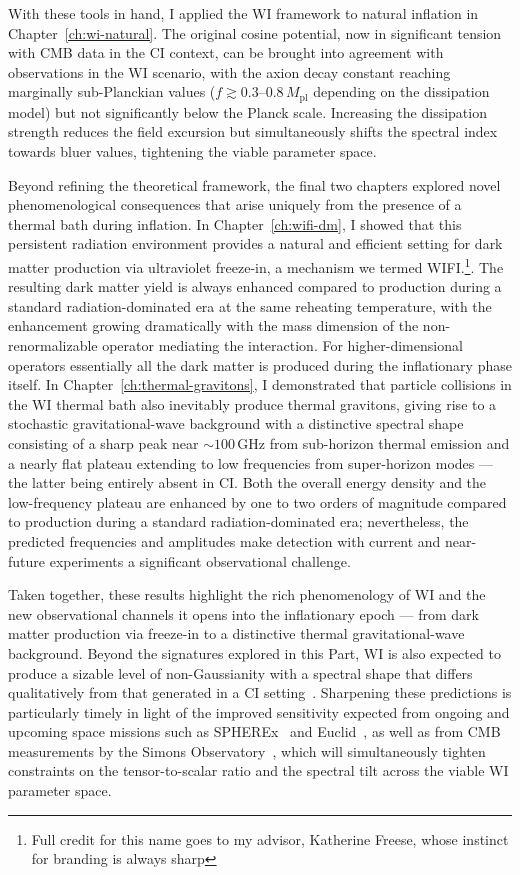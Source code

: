 With these tools in hand, I applied the WI framework to natural inflation in Chapter~\ref{ch:wi-natural}. The original cosine potential, now in significant tension with CMB data in the CI context, can be brought into agreement with observations in the WI scenario, with the axion decay constant reaching marginally sub-Planckian values ($f \gtrsim 0.3\text{--}0.8\,M_\mathrm{pl}$ depending on the dissipation model) but not significantly below the Planck scale. Increasing the dissipation strength reduces the field excursion but simultaneously shifts the spectral index towards bluer values, tightening the viable parameter space.


Beyond refining the theoretical framework, the final two chapters explored novel phenomenological consequences that arise uniquely from the presence of a thermal bath during inflation. In Chapter~\ref{ch:wifi-dm}, I showed that this persistent radiation environment provides a natural and efficient setting for dark matter production via ultraviolet freeze-in, a mechanism we termed WIFI.\footnote{Full credit for this name goes to my advisor, Katherine Freese, whose instinct for branding is always sharp}. The resulting dark matter yield is always enhanced compared to production during a standard radiation-dominated era at the same reheating temperature, with the enhancement growing dramatically with the mass dimension of the non-renormalizable operator mediating the interaction. For higher-dimensional operators essentially all the dark matter is produced during the inflationary phase itself. In Chapter~\ref{ch:thermal-gravitons}, I demonstrated that particle collisions in the WI thermal bath also inevitably produce thermal gravitons, giving rise to a stochastic gravitational-wave background with a distinctive spectral shape consisting of a sharp peak near $\sim 100\,$GHz from sub-horizon thermal emission and a nearly flat plateau extending to low frequencies from super-horizon modes --- the latter being entirely absent in CI. Both the overall energy density and the low-frequency plateau are enhanced by one to two orders of magnitude compared to production during a standard radiation-dominated era; nevertheless, the predicted frequencies and amplitudes make detection with current and near-future experiments a significant observational challenge.

Taken together, these results highlight the rich phenomenology of WI and the new observational channels it opens into the inflationary epoch --- from dark matter production via freeze-in to a distinctive thermal gravitational-wave background. Beyond the signatures explored in this Part, WI is also expected to produce a sizable level of non-Gaussianity with a spectral shape that differs qualitatively from that generated in a CI setting~\cite{Bastero-Gil:2014raa, Mirbabayi:2022cbt}. Sharpening these predictions is particularly timely in light of the improved sensitivity expected from ongoing and upcoming space missions such as SPHEREx~\cite{SPHEREx:2014bgr} and Euclid~\cite{Euclid:2024ris}, as well as from CMB measurements by the Simons Observatory~\cite{SimonsObservatory:2018koc,SimonsObservatory:2020noise}, which will simultaneously tighten constraints on the tensor-to-scalar ratio and the spectral tilt across the viable WI parameter space.